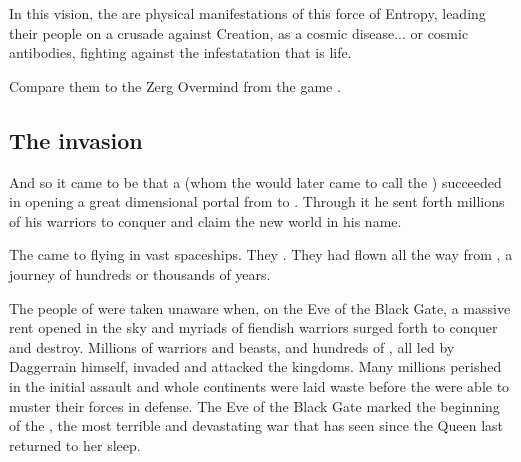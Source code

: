 In this vision, the \banekings{} are physical manifestations of this force of Entropy, leading their people on a crusade against Creation, as a cosmic disease... or cosmic antibodies, fighting against the infestatation that is life.

Compare them to the Zerg Overmind from the game \cite{VideoGame:Starcraft}. 










\subsection{The \bane{} invasion}
\index{\firstbanewar}
And so it came to be that a \baneking{} (whom the \dragons{} would later came to call the \quo{\Voidbringer}) succeeded in opening a great dimensional portal from \Erebos{} to \Miith{}. 
Through it he sent forth millions of his \bane{} warriors to conquer and claim the new world in his name. 

The \banes{} came to \Miith{} flying in vast spaceships. They . 
They had flown all the way from \Erebos{}, a journey of hundreds or thousands of years. 

The people of \Miith{} were taken unaware when, on the Eve of the Black Gate, a massive rent opened in the sky and myriads of fiendish \bane{} warriors surged forth to conquer and destroy. 
Millions of \bane{} warriors and beasts, and hundreds of \banelords, all led by Daggerrain himself, invaded and attacked the \draconic{} kingdoms. 
Many millions perished in the initial assault and whole continents were laid waste before the \ophidians{} were able to muster their forces in defense. 
The Eve of the Black Gate marked the beginning of the \Banewar, the most terrible and devastating war that \Miith{} has seen since the \Kraken{} Queen last returned to her sleep. 

